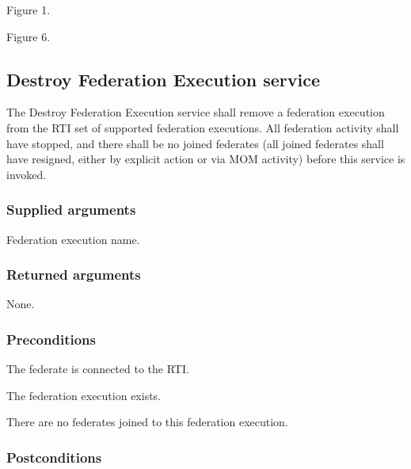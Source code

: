\begin{stdalphalist}
    \item Figure 1.
    \item Figure 6.
\end{stdalphalist}

\subsection{Destroy Federation Execution service}

The Destroy Federation Execution service shall remove a federation execution from the RTI set of supported federation executions. All federation activity shall have stopped, and there shall be no joined federates (all joined federates shall have resigned, either by explicit action or via MOM activity) before this service is invoked.

\subsubsection{Supplied arguments}

\begin{stdalphalist}
    \item Federation execution name.
\end{stdalphalist}

\subsubsection{Returned arguments}

\begin{stdalphalist}
    \item None.
\end{stdalphalist}

\subsubsection{Preconditions}

\begin{stdalphalist}
    \item The federate is connected to the RTI.
    \item The federation execution exists.
    \item There are no federates joined to this federation execution.
\end{stdalphalist}

\subsubsection{Postconditions}

